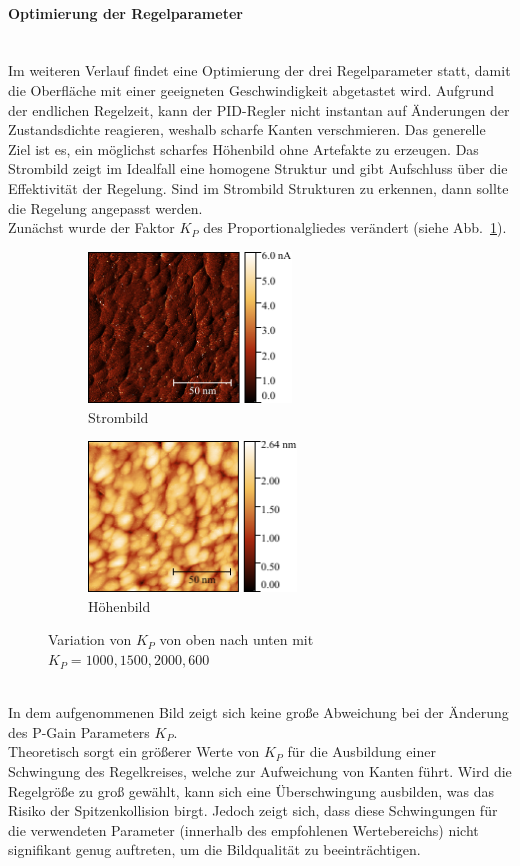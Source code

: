 \documentclass[a4paper,twoside,final]{article}
\begin{document}
\paragraph{Optimierung der Regelparameter}$~$\\
Im weiteren Verlauf findet eine Optimierung der drei Regelparameter statt, damit die Oberfläche mit einer geeigneten Geschwindigkeit abgetastet wird. Aufgrund der endlichen Regelzeit, kann der PID-Regler nicht instantan auf Änderungen der Zustandsdichte reagieren, weshalb scharfe Kanten verschmieren. Das generelle Ziel ist es, ein möglichst scharfes Höhenbild ohne Artefakte zu erzeugen. Das Strombild zeigt im Idealfall eine homogene Struktur und gibt Aufschluss über die Effektivität der Regelung. Sind im Strombild Strukturen zu erkennen, dann sollte die Regelung angepasst werden.\\
Zunächst wurde der Faktor $K_P$ des Proportionalgliedes verändert (siehe Abb.~\ref{fig:PGlied}).
\begin{figure}[htp]
    \centering
    \begin{subfigure}{0.45\textwidth}
        \includegraphics[height=4cm]{Bilder/Image01979_PGain_Strom.pdf}
        \caption{Strombild}
    \end{subfigure}
    \hspace{0.5cm}
    \begin{subfigure}{0.45\textwidth}
        \includegraphics[height=4cm]{Bilder/Image01979_PGain.pdf}
        \caption{Höhenbild}
    \end{subfigure}
    \caption{Variation von $K_P$ von oben nach unten mit $K_P = 1000, 1500, 2000, 600$}
    \label{fig:PGlied}
\end{figure}\\
In dem aufgenommenen Bild zeigt sich keine große Abweichung bei der Änderung des P-Gain Parameters $K_P$.\\
Theoretisch sorgt ein größerer Werte von $K_P$ für die Ausbildung einer Schwingung des Regelkreises, welche zur Aufweichung von Kanten führt. Wird die Regelgröße zu groß gewählt, kann sich eine Überschwingung ausbilden, was das Risiko der Spitzenkollision birgt. Jedoch zeigt sich, dass diese Schwingungen für die verwendeten Parameter (innerhalb des empfohlenen Wertebereichs) nicht signifikant genug auftreten, um die Bildqualität zu beeinträchtigen.\\
\end{document}
